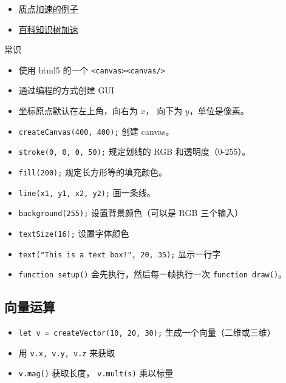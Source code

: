 
\begin{itemize}
\item \href{https://wuli.wiki/apps/PtAcc/}{质点加速的例子}
\item \href{https://wuli.wiki/apps/TwoBallSpring/}{百科知识树加速}
\end{itemize}

常识
\begin{itemize}
\item 使用 html5 的一个 \verb`<canvas><canvas/>`
\item 通过编程的方式创建 GUI
\item 坐标原点默认在左上角，向右为 $x$， 向下为 $y$，单位是像素。
\item \verb`createCanvas(400, 400);` 创建 canvas。
\item \verb`stroke(0, 0, 0, 50);` 规定划线的 RGB 和透明度（0-255）。
\item \verb`fill(200);` 规定长方形等的填充颜色。
\item \verb`line(x1, y1, x2, y2);` 画一条线。
\item \verb`background(255);` 设置背景颜色（可以是 RGB 三个输入）
\item \verb`textSize(16);` 设置字体颜色
\item \verb`text("This is a text box!", 20, 35);` 显示一行字
\item \verb`function setup()` 会先执行，然后每一帧执行一次 \verb`function draw()`。

\end{itemize}

\subsection{向量运算}
\begin{itemize}
\item \verb`let v = createVector(10, 20, 30);` 生成一个向量（二维或三维）
\item 用 \verb`v.x, v.y, v.z` 来获取
\item \verb`v.mag()` 获取长度， \verb`v.mult(s)` 乘以标量
\end{itemize}

